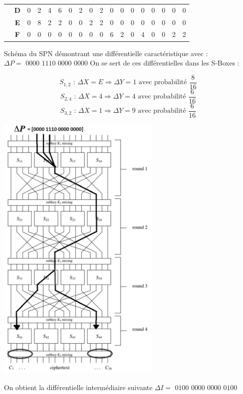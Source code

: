 \documentclass[fleqn]{article}
\begin{document}
\begin{table}[H]
\begin{tabular}{c|c|c|c|c|c|c|c|c|c|c|c|c|c|c|c|c|c|}
\multicolumn{1}{|c|}{}                                      & \textbf{D} & 0          & 2          & 4          & 6          & 0          & 2          & 0          & 2          & 0          & 0          & 0          & 0          & 0          & 0          & 0          & 0          \\ \cline{2-18} 
\multicolumn{1}{|c|}{}                                      & \textbf{E} & 0          & 8          & 2          & 2          & 0          & 0          & 2          & 2          & 0          & 0          & 0          & 0          & 0          & 0          & 0          & 0          \\ \cline{2-18} 
\multicolumn{1}{|c|}{}                                      & \textbf{F} & 0          & 0          & 0          & 0          & 0          & 0          & 0          & 0          & 6          & 2          & 0          & 4          & 0          & 0          & 2          & 2          \\ \hline
\end{tabular}
\end{table}

Schéma du SPN démontrant une différentielle caractéristique avec :
$\boxed{\Delta P = \text{ 0000 1110 0000 0000}}$\newline\newline
On se sert de ces différentielles dans les S-Boxes :

\[S_{1,2} \text{ : } \Delta X = E \Rightarrow \Delta Y = 1 \text{       avec probabilité } \frac{8}{16}\]
\[S_{2,4} \text{ : } \Delta X = 4 \Rightarrow \Delta Y = 4 \text{       avec probabilité } \frac{6}{16}\]
\[S_{3,2} \text{ : } \Delta X = 1 \Rightarrow \Delta Y = 9 \text{       avec probabilité } \frac{6}{16}\]

\includegraphics[width=300px]{SPN-Differential}
\centering

\noindent

On obtient la différentielle intermédiaire suivante $\boxed{\Delta I = \text{ 0100 0000 0000 0100}}$
\end{document}
